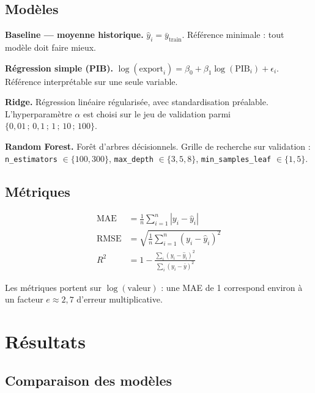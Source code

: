 \documentclass[11pt,a4paper]{article}
\begin{document}
\subsection{Modèles}

\textbf{Baseline — moyenne historique.} $\widehat{y}_i = \bar{y}_{\text{train}}$.
Référence minimale : tout modèle doit faire mieux.

\textbf{Régression simple (PIB).}
$\log(\text{export}_i) = \beta_0 + \beta_1 \log(\text{PIB}_i) + \epsilon_i$.
Référence interprétable sur une seule variable.

\textbf{Ridge.} Régression linéaire régularisée, avec standardisation préalable.
L'hyperparamètre $\alpha$ est choisi sur le jeu de validation parmi
$\{0{,}01\,;\,0{,}1\,;\,1\,;\,10\,;\,100\}$.

\textbf{Random Forest.} Forêt d'arbres décisionnels. Grille de recherche sur
validation : \texttt{n\_estimators} $\in \{100, 300\}$, \texttt{max\_depth}
$\in \{3, 5, 8\}$, \texttt{min\_samples\_leaf} $\in \{1, 5\}$.

\subsection{Métriques}

\begin{align}
\mathrm{MAE} &= \frac{1}{n}\sum_{i=1}^{n}\left|y_i-\widehat{y}_i\right| \\
\mathrm{RMSE} &= \sqrt{\frac{1}{n}\sum_{i=1}^{n}(y_i-\widehat{y}_i)^2} \\
R^2 &= 1 - \frac{\sum_{i}(y_i-\widehat{y}_i)^2}{\sum_{i}(y_i-\bar{y})^2}
\end{align}

Les métriques portent sur $\log(\text{valeur})$ : une MAE de 1 correspond environ à
un facteur $e \approx 2{,}7$ d'erreur multiplicative.

\section{Résultats}\label{sec:results}

\subsection{Comparaison des modèles}
\end{document}
